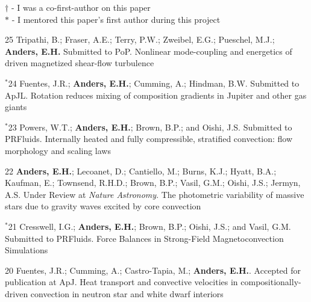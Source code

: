 {}
\hspace{\smallsephintwidth}$\dagger$ - I was a co-first-author on this paper \\
\hspace{\smallsephintwidth}$*$ - I mentored this paper's first author during this project
\vspace{0.3cm}



      {25}
      {
        Tripathi, B.; Fraser, A.E.; Terry, P.W.; Zweibel, E.G.; Pueschel, M.J.; \textbf{Anders, E.H.}
        Submitted to PoP.
      }
      {Nonlinear mode-coupling and energetics of driven magnetized shear-flow turbulence}

\cvpub{}
      {$^*$24}
      { Fuentes, J.R.; \textbf{Anders, E.H.}; Cumming, A.; Hindman, B.W. Submitted to ApJL.\hspace{-0.3cm}
      }
      {Rotation reduces mixing of composition gradients in Jupiter and other gas giants}

\cvpub{}
      {$^*$23}
      {
        Powers, W.T.; \textbf{Anders, E.H.}; Brown, B.P.; and Oishi, J.S.
        Submitted to PRFluids.\hspace{-0.5cm}
      }
      {Internally heated and fully compressible, stratified convection: flow morphology and scaling laws}

\cvpub{}
      {22}
      {
        \textbf{Anders, E.H.}; Lecoanet, D.; Cantiello, M.; Burns, K.J.; Hyatt, B.A.; Kaufman, E.; Townsend, R.H.D.; Brown, B.P.; Vasil, G.M.; Oishi, J.S.; Jermyn, A.S. Under Review at \textit{Nature Astronomy}.     
      }
      {The photometric variability of massive stars due to gravity waves excited by core convection}

\cvpub{}
      {$^*$21}
      {
        Cresswell, I.G.; \textbf{Anders, E.H.}; Brown, B.P.; Oishi, J.S.; and Vasil, G.M.
        Submitted to PRFluids. 
      }
      {Force Balances in Strong-Field Magnetoconvection Simulations}

\cvpub{}
      {20}
      {
        Fuentes, J.R.; Cumming, A.; Castro-Tapia, M.; \textbf{Anders, E.H.}. Accepted for publication at ApJ.
      }
      {Heat transport and convective velocities in compositionally-driven convection in neutron star and white dwarf interiors}

